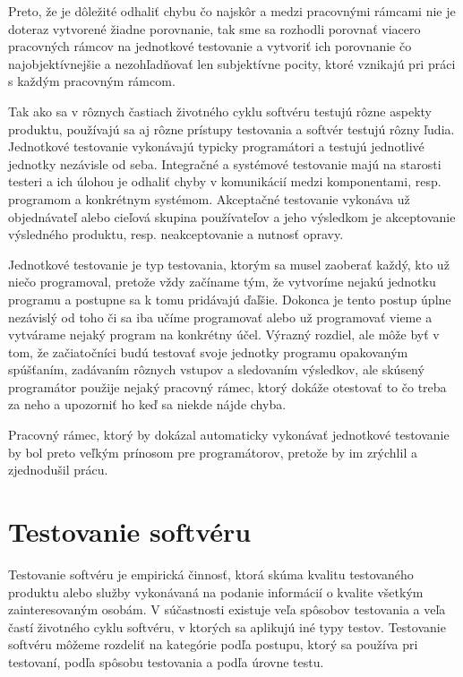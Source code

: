 \documentclass[11pt,twoside,slovak,a4paper]{article}
\begin{document}
	Preto, že je dôležité odhaliť chybu čo najskôr a medzi pracovnými rámcami nie je doteraz vytvorené žiadne porovnanie, tak sme sa rozhodli porovnať viacero pracovných rámcov na jednotkové testovanie a vytvoriť ich porovnanie čo najobjektívnejšie a nezohľadňovať len subjektívne pocity, ktoré vznikajú pri práci s každým pracovným rámcom.
		
	Tak ako sa v rôznych častiach životného cyklu softvéru testujú rôzne aspekty produktu, používajú sa aj rôzne prístupy testovania a softvér testujú rôzny ľudia. Jednotkové testovanie vykonávajú typicky programátori a testujú jednotlivé jednotky nezávisle od seba. Integračné a systémové testovanie majú na starosti testeri a ich úlohou je odhaliť chyby v komunikácií medzi komponentami, resp. programom a konkrétnym systémom. Akceptačné testovanie vykonáva už objednávateľ alebo cieľová skupina používateľov a jeho výsledkom je akceptovanie výsledného produktu, resp. neakceptovanie a nutnosť opravy\cite{Myers}.
	
	Jednotkové testovanie je typ testovania, ktorým sa musel zaoberať každý, kto už niečo programoval, pretože vždy začíname tým, že vytvoríme nejakú jednotku programu a postupne sa k tomu pridávajú ďaľšie. Dokonca je tento postup úplne nezávislý od toho či sa iba učíme programovať alebo už programovať vieme a vytvárame nejaký program na konkrétny účel. Výrazný rozdiel, ale môže byť v tom, že začiatočníci budú testovať svoje jednotky programu opakovaným spúšťaním, zadávaním rôznych vstupov a sledovaním výsledkov, ale skúsený programátor použije nejaký pracovný rámec, ktorý dokáže otestovať to čo treba za neho a upozorniť ho keď sa niekde nájde chyba.
	
	Pracovný rámec, ktorý by dokázal automaticky vykonávať jednotkové testovanie by bol preto veľkým prínosom pre programátorov, pretože by im zrýchlil a zjednodušil prácu. 
	
	
	\newpage
	\section{Testovanie softvéru}
	Testovanie softvéru je empirická činnosť, ktorá skúma kvalitu testovaného produktu alebo služby vykonávaná na podanie informácií o kvalite všetkým zainteresovaným osobám\cite{Kaner2006}. V súčastnosti existuje veľa spôsobov testovania a veľa častí životného cyklu softvéru, v ktorých sa aplikujú iné typy testov. Testovanie softvéru môžeme rozdeliť na kategórie podľa postupu, ktorý sa používa pri testovaní, podľa spôsobu testovania a podľa úrovne testu.
	
\end{document}
